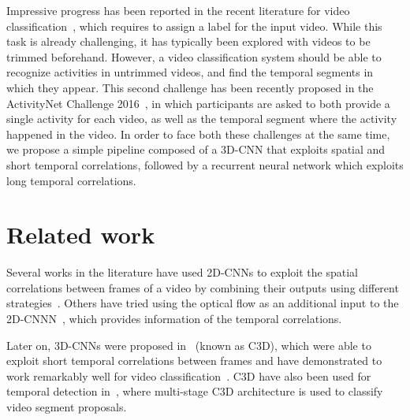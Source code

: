 \documentclass{article}
\begin{document}
Impressive progress has been reported in the recent literature for video classification~\cite{tran2014learning,tran2015deep,wang2015towards,yao2015describing}, which requires to assign a label for the input video. While this task is already challenging, it has typically been explored with videos to be trimmed beforehand.
However, a video classification system should be able to recognize activities in untrimmed videos, and find the temporal segments in which they appear.
This second challenge has been recently proposed in the ActivityNet Challenge 2016~\cite{caba2015activitynet}, in which participants are asked to both provide a single activity for each video, as well as the temporal segment where the activity happened in the video.
In order to face both these challenges at the same time, we propose a simple pipeline composed of a 3D-CNN that exploits spatial and short temporal correlations, followed by a recurrent neural network which exploits long temporal correlations.


\section{Related work}


Several works in the literature have used 2D-CNNs to exploit the spatial correlations between frames of a video by combining their outputs using different strategies~\cite{gkioxari2015contextual,yeung2015end,ballas2015delving}. Others have tried using the optical flow as an additional input to the 2D-CNNN~\cite{wang2015towards}, which provides information of the temporal correlations. %

Later on, 3D-CNNs were proposed in~\cite{tran2014learning} (known as C3D), which were able to exploit short temporal correlations between frames and have demonstrated to work remarkably well for video classification~\cite{tran2014learning,tran2015deep}. C3D have also been used for temporal detection in~\cite{scnn_shou_wang_chang_cvpr16}, where multi-stage C3D architecture is used to classify video segment proposals.
\end{document}

